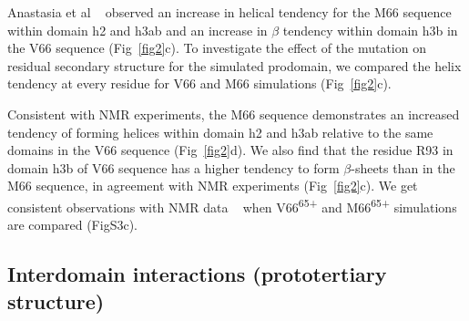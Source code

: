 \documentclass[journal=jacsat,manuscript=article]{achemso}
\begin{document}
Anastasia et al ~\cite{Anastasia2013} observed an increase in helical tendency for the M66 sequence within domain h2 and h3ab and an increase in $\beta$ tendency within domain h3b in the V66 sequence (Fig~\ref{fig2}c). 
To investigate the effect of the mutation on residual secondary structure for the simulated prodomain, we compared the helix tendency at every residue for V66 and M66 simulations (Fig~\ref{fig2}c). 

Consistent with NMR experiments, the M66 sequence demonstrates an increased tendency of forming helices within domain h2 and h3ab relative to the same domains in the V66 sequence (Fig~\ref{fig2}d). We also find that the residue R93 in domain h3b of V66 sequence has a higher tendency to form $\beta$-sheets than in the M66 sequence, in agreement with NMR experiments (Fig~\ref{fig2}c). We get consistent observations with NMR data ~\cite{Anastasia2013} when V66\textsuperscript{65+} and M66\textsuperscript{65+} simulations are compared (FigS3c).
 


\subsection{Interdomain interactions (prototertiary structure)}

\end{document}
